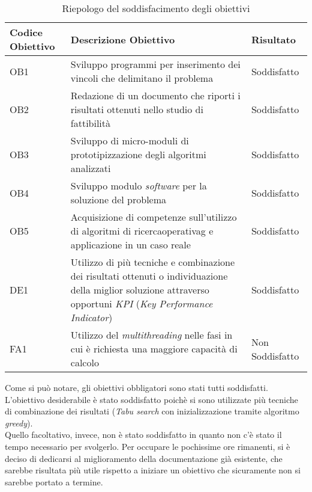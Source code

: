 \begin{center}
    \begin{longtable}{m{3cm}m{9cm}m{2cm}}
    \caption{Riepologo del soddisfacimento degli obiettivi}
    \label{tab:raggiungimento-obiettivi}
    \\ \hline
    \centering \textbf{Codice Obiettivo} & \centering \textbf{Descrizione Obiettivo} & \centering \textbf{Risultato} \arraybackslash \\
    \hline
    \centering OB1 & Sviluppo programmi per inserimento
    dei vincoli che delimitano il problema & \centering Soddisfatto \arraybackslash \\
    \hline
    \centering OB2 & Redazione di un documento che riporti
    i risultati ottenuti nello studio di fattibilità & \centering Soddisfatto \arraybackslash \\
    \hline
    \centering OB3 & Sviluppo di micro-moduli di prototipizzazione degli algoritmi analizzati & \centering Soddisfatto \arraybackslash \\
    \hline
    \centering OB4 & Sviluppo modulo \textit{software} per
    la soluzione del problema & \centering Soddisfatto \arraybackslash \\
    \hline
    \centering OB5 & Acquisizione di competenze sull’utilizzo
    di algoritmi di \gls{ricercaoperativag} e
    applicazione in un caso reale & \centering Soddisfatto \arraybackslash \\
    \hline
    \centering DE1 & Utilizzo di più tecniche e combinazione dei risultati
    ottenuti o individuazione della miglior soluzione attraverso
    opportuni \textit{KPI} (\textit{Key Performance Indicator}) & \centering Soddisfatto \arraybackslash \\
    \hline
    \centering FA1 & Utilizzo del \textit{multithreading}
    nelle fasi in cui è richiesta una
    maggiore capacità di calcolo & \centering Non Soddisfatto \arraybackslash \\
    \hline
    \end{longtable}
\end{center}%

\noindent Come si può notare, gli obiettivi obbligatori
sono stati tutti soddisfatti.\\
L'obiettivo desiderabile è stato soddisfatto poichè si sono utilizzate più tecniche
di combinazione dei risultati (\textit{Tabu search} con inizializzazione tramite algoritmo \textit{greedy}).\\
Quello facoltativo, invece, non è stato soddisfatto in quanto
non c'è stato il tempo necessario per
svolgerlo.
Per occupare le pochissime ore rimanenti, si è deciso di dedicarsi
al miglioramento della documentazione già esistente, che sarebbe risultata
più utile rispetto a iniziare un obiettivo che sicuramente non si sarebbe portato a termine.

